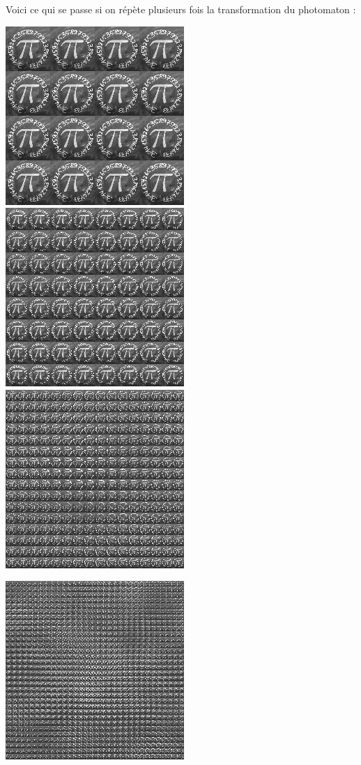 \documentclass[11pt,class=report,crop=false]{standalone}
\begin{document}
\begin{cours}
Voici ce qui se passe si on répète plusieurs fois la transformation du photomaton :
\begin{center}
\includegraphics[scale=\myscale,scale=0.3]{images_fiche/pi_gimp_new_photo_2.png}\qquad
\includegraphics[scale=\myscale,scale=0.3]{images_fiche/pi_gimp_new_photo_3.png}\qquad
\includegraphics[scale=\myscale,scale=0.3]{images_fiche/pi_gimp_new_photo_4.png}
\end{center}
\begin{center}
\includegraphics[scale=\myscale,scale=0.3]{images_fiche/pi_gimp_new_photo_5.png}\qquad

\end{center}
\end{cours}
\end{document}

